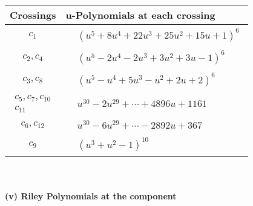 \documentclass[1p]{elsarticle_modified}
\theoremstyle{definition}
\begin{document}
\begin{tabular}{m{50pt}|m{274pt}}
Crossings & \hspace{64pt}u-Polynomials at each crossing \\
\hline $$\begin{aligned}c_{1}\end{aligned}$$&$\begin{aligned}
&(u^5+8 u^4+22 u^3+25 u^2+15 u+1)^6
\end{aligned}$\\
\hline $$\begin{aligned}c_{2},c_{4}\end{aligned}$$&$\begin{aligned}
&(u^5-2 u^4-2 u^3+3 u^2+3 u-1)^6
\end{aligned}$\\
\hline $$\begin{aligned}c_{3},c_{8}\end{aligned}$$&$\begin{aligned}
&(u^5- u^4+5 u^3- u^2+2 u+2)^6
\end{aligned}$\\
\hline $$\begin{aligned}c_{5},c_{7},c_{10}\\c_{11}\end{aligned}$$&$\begin{aligned}
&u^{30}-2 u^{29}+\cdots+4896 u+1161
\end{aligned}$\\
\hline $$\begin{aligned}c_{6},c_{12}\end{aligned}$$&$\begin{aligned}
&u^{30}-6 u^{29}+\cdots-2892 u+367
\end{aligned}$\\
\hline $$\begin{aligned}c_{9}\end{aligned}$$&$\begin{aligned}
&(u^3+u^2-1)^{10}
\end{aligned}$\\
\hline
\end{tabular}\\~\\
\newpage\renewcommand{\arraystretch}{1}
\flushleft \textbf{(v) Riley Polynomials at the component}\newline \\
\end{document}
